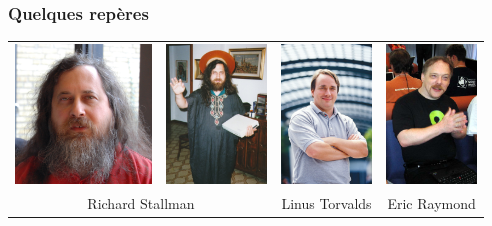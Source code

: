 \documentclass[10pt]{beamer}
\begin{document}

\begin{frame}
  \frametitle{Quelques repères}
  \begin{tabular}{cccc}
      \includegraphics[height=10em]{rms.jpg} 
      &
      \includegraphics[height=10em]{saintignucius.jpg}
      &
      \includegraphics[height=10em]{linus.jpg} 
      & 
      \includegraphics[height=10em]{esr.jpg} 
      \\
      \multicolumn{2}{c}{Richard Stallman}
      &
      Linus Torvalds
      &
      Eric Raymond\\
  \end{tabular}
\end{frame}

\end{document}
